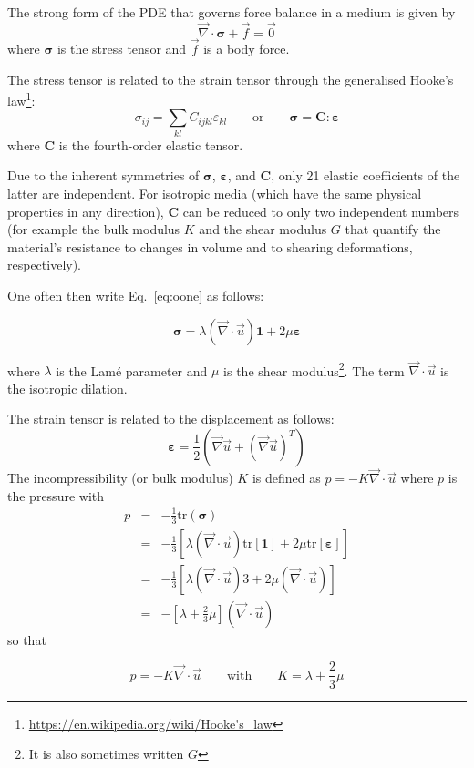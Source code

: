 The strong form of the PDE that governs force balance in a medium is given by
\[
\vec{\nabla}\cdot{\bm \sigma}  + \vec{f} = \vec{0}
\]
where ${\bm \sigma}$ is the stress tensor and $\vec{f}$ is a body force.

The stress tensor is related to the strain tensor through the generalised 
Hooke's law\footnote{\url{https://en.wikipedia.org/wiki/Hooke's_law}}:
\begin{equation}
\sigma_{ij}=\sum_{kl}C_{ijkl}\varepsilon_{kl} 
\qquad
\text{or}
\qquad
{\bm \sigma} = {\bm C} : {\bm \varepsilon}
\label{eq:oone}
\end{equation}
where ${\bm C}$ is the fourth-order elastic tensor.

Due to the inherent symmetries of ${\bm \sigma}$, ${\bm \varepsilon}$, and ${\bm C}$, 
only 21 elastic coefficients of the latter are independent. 
For isotropic media (which have the same physical properties in any direction), ${\bm C}$ 
can be reduced to only two independent numbers (for example the bulk modulus $K$ and the shear modulus $G$ 
that quantify the material's resistance to changes in volume and to shearing deformations, respectively). 

One often then write Eq.~\eqref{eq:oone} as follows:

\begin{mdframed}[backgroundcolor=blue!5]
\begin{equation}
{\bm \sigma} = \lambda (\vec{\nabla}\cdot\vec{u}) {\bm 1} + 2\mu {\bm \varepsilon}   \label{eq:twoELAST}
\end{equation}
\end{mdframed}
where $\lambda$ is the Lam\'e parameter and $\mu$ is the shear modulus\footnote{It is also sometimes written $G$}.
The term $\vec{\nabla}\cdot\vec{u}$ is the isotropic dilation.


The strain tensor is related to the displacement as follows: 
\[
{\bm \varepsilon} = \frac{1}{2}(\vec{\nabla}\vec{u} + (\vec{\nabla}\vec{u})^T)
\]
The incompressibility (or bulk modulus) $K$ is defined as $p=-K \vec{\nabla}\cdot\vec{u}$ 
where $p$ is the pressure with 
\begin{eqnarray}
p&=&-\frac{1}{3} \text{tr}({\bm \sigma}) \nonumber\\
 &=& -\frac{1}{3} [ \lambda (\vec{\nabla}\cdot\vec{u}) \text{tr}[{\bm 1}] + 2 \mu \text{tr}[{\bm \varepsilon}]] \nonumber\\
 &=& -\frac{1}{3} [ \lambda (\vec{\nabla}\cdot\vec{u})  3  + 2 \mu  (\vec{\nabla}\cdot\vec{u}) ] \nonumber\\
 &=& -\left[ \lambda + \frac{2}{3} \mu \right] (\vec{\nabla}\cdot\vec{u})  
\end{eqnarray}
so that 
\begin{mdframed}[backgroundcolor=blue!5]
\[
p=-K \vec{\nabla}\cdot\vec{u} 
\qquad
\text{with}
\qquad
K=\lambda+\frac{2}{3}\mu
\]
\end{mdframed}


